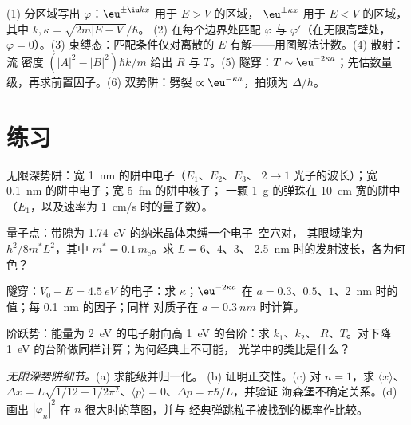 \begin{method}[势阱与势垒]\label{meth:b2:potential-wells-tunneling:method}
(1) 分区域写出 $\varphi$：$\eu^{\pm\iu kx}$ 用于 $E > V$ 的区域，
$\eu^{\pm\kappa x}$ 用于 $E < V$ 的区域，其中 $k, \kappa = \sqrt{2m|E - V|}/\hbar$。
(2) 在每个边界处匹配 $\varphi$ 与 $\varphi'$（在无限高壁处，
$\varphi = 0$）。(3) 束缚态：匹配条件仅对离散的
$E$ 有解——用图解法计数。(4) 散射：流
密度 $(|A|^2 - |B|^2)\hbar k/m$ 给出 $R$ 与 $T$。(5) 隧穿：$T \sim
\eu^{-2\kappa a}$；先估数量级，再求前置因子。(6)
双势阱：劈裂 $\propto\eu^{-\kappa a}$，拍频为 $\Delta/h$。
\end{method}

\section{练习}

\begin{exercise}[$\star$]\label{exo:b2:potential-wells-tunneling:1}
无限深势阱：宽 \qty{1}{nm} 的阱中电子（$E_1$、$E_2$、$E_3$、
$2 \to 1$ 光子的波长）；宽 \qty{0.1}{nm} 的阱中电子；宽 \qty{5}{fm} 的阱中核子；
一颗 \qty{1}{g} 的弹珠在 \qty{10}{cm} 宽的阱中（$E_1$，以及速率为
\qty{1}{cm/s} 时的量子数）。
\end{exercise}

\begin{exercise}[$\star$]\label{exo:b2:potential-wells-tunneling:2}
量子点：带隙为 \qty{1.74}{eV} 的纳米晶体束缚一个电子–空穴对，
其限域能为 $h^2/8m^*L^2$，其中
$m^* = 0.1\,m_{\text{e}}$。求 $L = 6$、$4$、$3$、
\qty{2.5}{nm} 时的发射波长，各为何色？
\end{exercise}

\begin{exercise}[$\star$]\label{exo:b2:potential-wells-tunneling:3}
隧穿：$V_0 - E = \qty{4.5}{eV}$ 的电子：求 $\kappa$；$\eu^{-2\kappa a}$
在 $a = 0.3$、$0.5$、$1$、\qty{2}{nm} 时的值；每 \qty{0.1}{nm} 的因子；同样
对质子在 $a = \qty{0.3}{nm}$ 时计算。
\end{exercise}

\begin{exercise}[$\star$]\label{exo:b2:potential-wells-tunneling:4}
阶跃势：能量为 \qty{2}{eV} 的电子射向高 \qty{1}{eV} 的台阶：求 $k_1$、$k_2$、
$R$、$T$。对下降 \qty{1}{eV} 的台阶做同样计算；为何经典上不可能，
光学中的类比是什么？
\end{exercise}

\begin{exercise}[$\star\star$]\label{exo:b2:potential-wells-tunneling:5}
\emph{无限深势阱细节。}(a) 求能级并归一化。
(b) 证明正交性。(c) 对 $n = 1$，求 $\langle x\rangle$、$\Delta x =
L\sqrt{1/12 - 1/2\pi^2}$、$\langle p\rangle = 0$、$\Delta p = \pi\hbar/L$，并验证
海森堡不确定关系。(d) 画出 $|\varphi_n|^2$ 在 $n$ 很大时的草图，并与
经典弹跳粒子被找到的概率作比较。
\end{exercise}

